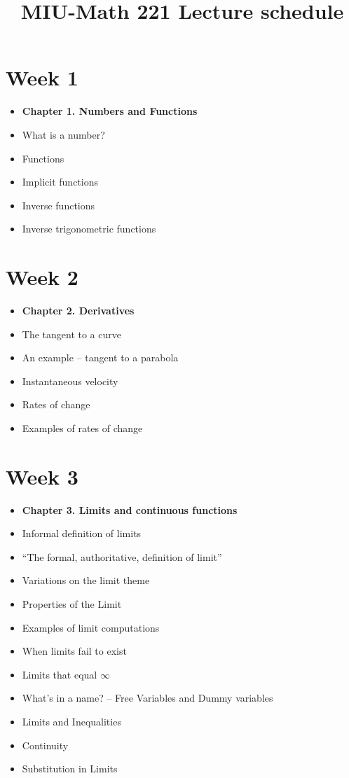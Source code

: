 \documentclass{amsproc}
\begin{document}
\title{MIU-Math 221 Lecture schedule}
\maketitle
\section*{Week 1}
\begin{itemize}
\item \textbf{Chapter 1. Numbers and Functions}
\item What is a number?
\item Functions
\item Implicit functions
\item Inverse functions
\item Inverse trigonometric functions
\end{itemize}

\section*{Week 2}
\begin{itemize}
\item \textbf{Chapter 2. Derivatives}
\item The tangent to a curve
\item An example -- tangent to a parabola
\item Instantaneous velocity
\item Rates of change
\item Examples of rates of change
\end{itemize}

\section*{Week 3}
\begin{itemize}
\item \textbf{Chapter 3.  Limits and continuous functions}
\item Informal definition of limits
\item ``The formal, authoritative, definition of limit''
\item Variations on the limit theme
\item Properties of the Limit
\item Examples of limit computations
\item When limits fail to exist
\item Limits that equal $\infty$
\item What's in a name? -- Free Variables and Dummy variables
\item Limits and Inequalities
\item Continuity
\item Substitution in Limits
\end{itemize}
\end{document}
